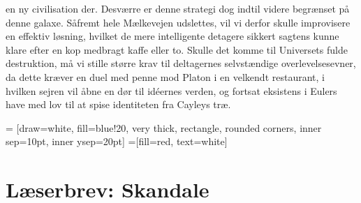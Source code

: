 \begin{minipage}[b]{0.95\linewidth}
\begin{minipage}[t]{0.47\textwidth}
en ny civilisation der. Desværre er denne strategi dog indtil videre begrænset på denne galaxe. Såfremt hele Mælkevejen udslettes, vil vi derfor skulle improvisere en effektiv løsning, hvilket de mere intelligente detagere sikkert sagtens kunne klare efter en kop medbragt kaffe eller to. Skulle det komme til Universets fulde destruktion, må vi stille større krav til deltagernes selvstændige overlevelsesevner, da dette kræver en duel med penne mod Platon i en velkendt restaurant, i hvilken sejren vil åbne en dør til idéernes verden, og fortsat eksistens i Eulers have med lov til at spise identiteten fra Cayleys træ.


\end{minipage}
\hfill\begin{minipage}[t]{0.47\textwidth}

\vspace{1mm}
 = [draw=white, fill=blue!20, very thick,
    rectangle, rounded corners, inner sep=10pt, inner ysep=20pt]
 =[fill=red, text=white]

%
\vspace{-2mm}

\section*{Læserbrev: Skandale}


\end{minipage}
\end{minipage}
